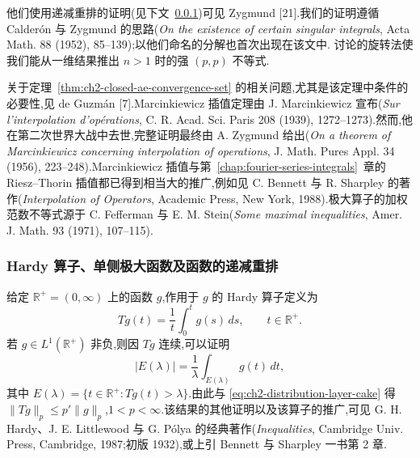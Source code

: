 \hypertarget{sample-page-051}{}
他们使用递减重排的证明(见下文~\ref{subsec:ch2-hardy-operator})可见 Zygmund [21].我们的证明遵循 Calderón 与 Zygmund 的思路(\emph{On the existence of certain singular integrals}, Acta Math. 88 (1952), 85--139);以他们命名的分解也首次出现在该文中. 讨论的旋转法使我们能从一维结果推出 $n>1$ 时的强 $(p,p)$ 不等式.

关于定理~\ref{thm:ch2-closed-ae-convergence-set} 的相关问题,尤其是该定理中条件的必要性,见 de Guzmán [7].Marcinkiewicz 插值定理由 J. Marcinkiewicz 宣布(\emph{Sur l'interpolation d'opérations}, C. R. Acad. Sci. Paris 208 (1939), 1272--1273).然而,他在第二次世界大战中去世,完整证明最终由 A. Zygmund 给出(\emph{On a theorem of Marcinkiewicz concerning interpolation of operations}, J. Math. Pures Appl. 34 (1956), 223--248).Marcinkiewicz 插值与第~\ref{chap:fourier-series-integrals}~章的 Riesz--Thorin 插值都已得到相当大的推广,例如见 C. Bennett 与 R. Sharpley 的著作(\emph{Interpolation of Operators}, Academic Press, New York, 1988).极大算子的加权范数不等式源于 C. Fefferman 与 E. M. Stein(\emph{Some maximal inequalities}, Amer. J. Math. 93 (1971), 107--115).

\subsubsection{Hardy 算子、单侧极大函数及函数的递减重排}
\label{subsec:ch2-hardy-operator}

给定 $\mathbb R^+=(0,\infty)$ 上的函数 $g$,作用于 $g$ 的 Hardy 算子定义为
\[
 Tg(t)=\frac1t\int_0^tg(s)\,ds,\qquad t\in\mathbb R^+.
\]
若 $g\in L^1(\mathbb R^+)$ 非负,则因 $Tg$ 连续,可以证明
\begin{equation}
\label{eq:ch2-hardy-level-set}
 |E(\lambda)|=\frac1\lambda\int_{E(\lambda)}g(t)\,dt,
\end{equation}
其中 $E(\lambda)=\{t\in\mathbb R^+:Tg(t)>\lambda\}$.由此与 \eqref{eq:ch2-distribution-layer-cake} 得
$\|Tg\|_p\le p'\|g\|_p$,$1<p<\infty$.该结果的其他证明以及该算子的推广,可见 G. H. Hardy、J. E. Littlewood 与 G. Pólya 的经典著作(\emph{Inequalities}, Cambridge Univ. Press, Cambridge, 1987;初版 1932),或上引 Bennett 与 Sharpley 一书第 2 章.

